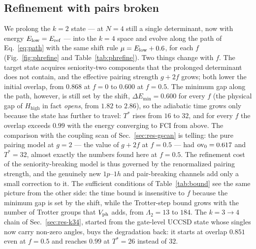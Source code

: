 \documentclass[
  aps,            %
  prc,            %
  reprint,        %
  superscriptaddress,
  floatfix,
  nofootinbib
]{revtex4-2}
\newcommand{\Hhigh}{H_{\mathrm{high}}}
\begin{document}
\subsection{Refinement with pairs broken}
\label{sec:ph-refine}
We prolong the $k=2$ state --- at $N=4$ still a single determinant, now with
energy $E_{\rm low}=E_{\rm ref}$ --- into the $k=4$ space and evolve along the
path of Eq.~\eqref{eq:path} with the same shift rule $\mu=E_{\rm low}+0.6$, for
each $f$ (Fig.~\ref{fig:phrefine} and Table~\ref{tab:phrefine}).  Two things
change with $f$.  The target state acquires seniority-two components that the
prolonged determinant does not contain, and the effective pairing strength
$g+2f$ grows; both lower the initial overlap, from $0.868$ at $f=0$ to $0.600$
at $f=0.5$.  The minimum gap along the path, however, is still set by the shift,
$\Delta E_{\min}=0.600$ for every $f$ (the physical gap of $\Hhigh$ in fact
\emph{opens}, from $1.82$ to $2.86$), so the adiabatic time grows only because
the state has further to travel: $T^{*}$ rises from $16$ to $32$, and for every
$f$ the overlap exceeds $0.99$ with the energy converging to FCI from above.
The comparison with the coupling scan of Sec.~\ref{sec:res-gscan} is telling:
the pure pairing model at $g=2$ --- the value of $g+2f$ at $f=0.5$ --- had
${\rm ov}_0=0.617$ and $T^{*}=32$, almost exactly the numbers found here at
$f=0.5$.  The refinement cost of the seniority-breaking model is thus governed
by the renormalized pairing strength, and the genuinely new $1p$--$1h$ and
pair-breaking channels add only a small correction to it.  The sufficient
conditions of Table~\ref{tab:bound} see the same picture from the other side:
the time bound is insensitive to $f$ because the minimum gap is set by the
shift, while the Trotter-step bound grows with the number of Trotter groups
that $V_{\rm ph}$ adds, from $\Lambda_2=13$ to $184$.  The $k=3\to4$ chain
of Sec.~\ref{sec:res-k34}, started from the gate-level UCCSD state whose singles
now carry non-zero angles, buys the degradation back: it starts at overlap
$0.851$ even at $f=0.5$ and reaches $0.99$ at $T^{*}=26$ instead of $32$.
\end{document}
